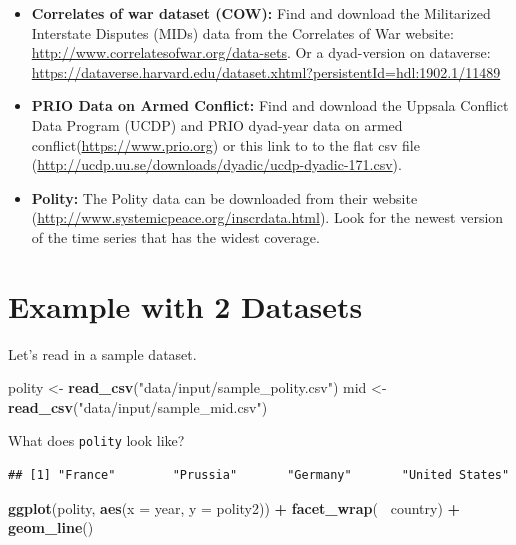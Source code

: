 \documentclass[]{book}
\newenvironment{Shaded}{\begin{snugshade}}{\end{snugshade}}
\newcommand{\KeywordTok}[1]{\textcolor[rgb]{0.13,0.29,0.53}{\textbf{#1}}}
\newcommand{\DataTypeTok}[1]{\textcolor[rgb]{0.13,0.29,0.53}{#1}}
\newcommand{\StringTok}[1]{\textcolor[rgb]{0.31,0.60,0.02}{#1}}
\newcommand{\OperatorTok}[1]{\textcolor[rgb]{0.81,0.36,0.00}{\textbf{#1}}}
\newcommand{\NormalTok}[1]{#1}
\providecommand{\tightlist}{%
  \setlength{\itemsep}{0pt}\setlength{\parskip}{0pt}}
\theoremstyle{definition}
\theoremstyle{definition}
\theoremstyle{definition}
\theoremstyle{remark}
\begin{document}
\begin{itemize}
\tightlist
\item
  \textbf{Correlates of war dataset (COW):} Find and download the
  Militarized Interstate Disputes (MIDs) data from the Correlates of War
  website: \url{http://www.correlatesofwar.org/data-sets}. Or a
  dyad-version on dataverse:
  \url{https://dataverse.harvard.edu/dataset.xhtml?persistentId=hdl:1902.1/11489}
\item
  \textbf{PRIO Data on Armed Conflict:} Find and download the Uppsala
  Conflict Data Program (UCDP) and PRIO dyad-year data on armed
  conflict(\url{https://www.prio.org}) or this link to to the flat csv
  file (\url{http://ucdp.uu.se/downloads/dyadic/ucdp-dyadic-171.csv}).
\item
  \textbf{Polity:} The Polity data can be downloaded from their website
  (\url{http://www.systemicpeace.org/inscrdata.html}). Look for the
  newest version of the time series that has the widest coverage.
\end{itemize}

\section{Example with 2 Datasets}\label{example-with-2-datasets}

Let's read in a sample dataset.

\begin{Shaded}
\begin{Highlighting}[]
\NormalTok{polity <-}\StringTok{ }\KeywordTok{read_csv}\NormalTok{(}\StringTok{"data/input/sample_polity.csv"}\NormalTok{)}
\NormalTok{mid <-}\StringTok{ }\KeywordTok{read_csv}\NormalTok{(}\StringTok{"data/input/sample_mid.csv"}\NormalTok{)}
\end{Highlighting}
\end{Shaded}

What does \texttt{polity} look like?

\begin{Shaded}
\end{Shaded}

\begin{verbatim}
## [1] "France"        "Prussia"       "Germany"       "United States"
\end{verbatim}

\begin{Shaded}
\begin{Highlighting}[]
\KeywordTok{ggplot}\NormalTok{(polity, }\KeywordTok{aes}\NormalTok{(}\DataTypeTok{x =}\NormalTok{ year, }\DataTypeTok{y =}\NormalTok{ polity2)) }\OperatorTok{+}
\StringTok{  }\KeywordTok{facet_wrap}\NormalTok{(}\OperatorTok{~}\StringTok{ }\NormalTok{country) }\OperatorTok{+}
\StringTok{  }\KeywordTok{geom_line}\NormalTok{()}
\end{Highlighting}
\end{Shaded}
\end{document}
